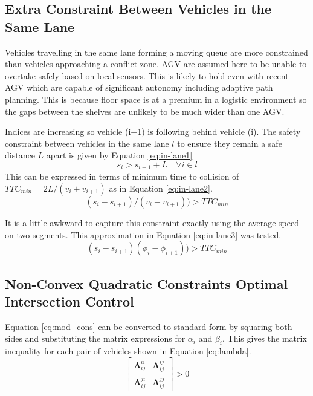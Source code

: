 \subsection{Extra Constraint Between Vehicles in the Same Lane}
Vehicles travelling in the same lane forming a moving queue are more constrained than vehicles approaching a conflict zone. AGV are assumed here to be unable to overtake safely based on local sensors. This is likely to hold even with recent AGV which are capable of significant autonomy including adaptive path planning. This is because floor space is at a premium in a logistic environment so the gaps between the shelves are unlikely to be much wider than one AGV.

Indices are increasing so vehicle (i+1) is following behind vehicle (i). The safety constraint between vehicles in the same lane $l$ to ensure they remain a safe distance $L$ apart is given by Equation \ref{eq:in-lane1}
\begin{equation}
s_{i} > s_{i+1} + L \quad \forall i \in l
\label{eq:in-lane1}
\end{equation}
This can be expressed in terms of minimum time to collision of $TTC_{min} = 2 L/(v_i + v_{i+1})$ as in Equation \ref{eq:in-lane2}.
\begin{equation}
(s_{i}-s_{i+1})/(v_i - v_{i+1})) > TTC_{min}
\label{eq:in-lane2}
\end{equation}

It is a little awkward to capture this constraint exactly using the average speed on two segments. This approximation in Equation \ref{eq:in-lane3} was tested.
\begin{equation}
(s_{i}-s_{i+1})(\phi_i - \phi_{i+1})) > TTC_{min}
\label{eq:in-lane3}
\end{equation}  
\subsection{Non-Convex Quadratic Constraints Optimal Intersection Control}
\label{sec:quad}
Equation \ref{eq:mod_cons} can be converted to standard form by squaring both sides and substituting the matrix expressions for $\alpha_i$ and $\beta_i$. This gives the matrix inequality for each pair of vehicles shown in Equation \ref{eq:lambda}.
\begin{equation}
[\bm{\phi}_i^T, \bm{\phi}_j^T] \left[\begin{array}{cc}
\bm{\Lambda}_{ij}^{ii} & \bm{\Lambda}_{ij}^{ij} \\
\bm{\Lambda}_{ij}^{ji} & \bm{\Lambda}_{ij}^{jj}
\end{array}\right] > 0
\label{eq:lambda}
\end{equation}


